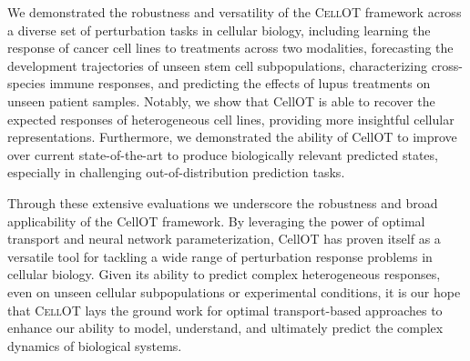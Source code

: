 
We demonstrated the robustness and versatility of the \textsc{CellOT} framework across a diverse set of perturbation tasks in cellular biology, including
learning the response of cancer cell lines to treatments across two modalities,
forecasting the development trajectories of unseen stem cell subpopulations, 
characterizing cross-species immune responses,
and predicting the effects of lupus treatments on unseen patient samples.
Notably, we show that CellOT is able to recover the expected responses of heterogeneous cell lines, providing more insightful cellular representations.
Furthermore, we demonstrated the ability of CellOT to improve over current state-of-the-art to produce biologically relevant predicted states, especially in challenging out-of-distribution prediction tasks.

Through these extensive evaluations we underscore the robustness and broad applicability of the CellOT framework.
By leveraging the power of optimal transport and neural network parameterization, CellOT has proven itself as a versatile tool for tackling a wide range of perturbation response problems in cellular biology.
Given its ability to predict complex heterogeneous responses, even on unseen cellular subpopulations or experimental conditions,
it is our hope that \textsc{CellOT} lays the ground work for optimal transport-based approaches to enhance our ability to model, understand, and ultimately predict the complex dynamics of biological systems.


